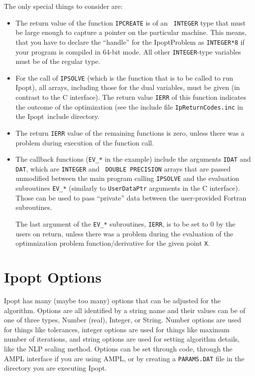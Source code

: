 \documentclass[letter,10pt]{article}
\newcommand{\Ipopt}{{\sc Ipopt}}
\begin{document}
The only special things to consider are:
\begin{itemize}
\item The return value of the function {\tt IPCREATE} is of an {\tt
    INTEGER} type that must be large enough to capture a pointer
  on the particular machine.  This means, that you have to declare
  the ``handle'' for the IpoptProblem as {\tt INTEGER*8} if your
  program is compiled in 64-bit mode.  All other {\tt INTEGER}-type
  variables must be of the regular type.
\item For the call of {\tt IPSOLVE} (which is the function that is to
  be called to run \Ipopt), all arrays, including those for the dual
  variables, must be given (in contrast to the C interface).  The
  return value {\tt IERR} of this function indicates the outcome of
  the optimization (see the include file {\tt IpReturnCodes.inc} in
  the \Ipopt\ include directory.
\item The return {\tt IERR} value of the remaining functions is zero,
  unless there was a problem during execution of the function call.
\item The callback functions ({\tt EV\_*} in the example) include the
  arguments {\tt IDAT} and {\tt DAT}, which are {\tt INTEGER} and {\tt
    DOUBLE PRECISION} arrays that are passed unmodified between the
  main program calling {\tt IPSOLVE} and the evaluation subroutines
  {\tt EV\_*} (similarly to {\tt UserDataPtr} arguments in the C
  interface).  Those can be used to pass ``private'' data between
  the user-provided Fortran subroutines.

  The last argument of the {\tt EV\_*} subroutines, {\tt IERR}, is to
  be set to 0 by the users on return, unless there was a problem
  during the evaluation of the optimnization problem
  function/derivative for the given point {\tt X}.
\end{itemize}


\section{Ipopt Options}\label{sec.options}
Ipopt has many (maybe too many) options that can be adjusted for the
algorithm.  Options are all identified by a string name and their
values can be of one of three types, Number (real), Integer, or
String. Number options are used for things like tolerances, integer
options are used for things like maximum number of iterations, and
string options are used for setting algorithm details, like the NLP
scaling method. Options can be set through code, through the AMPL
interface if you are using AMPL, or by creating a {\tt PARAMS.DAT}
file in the directory you are executing Ipopt.
\end{document}
